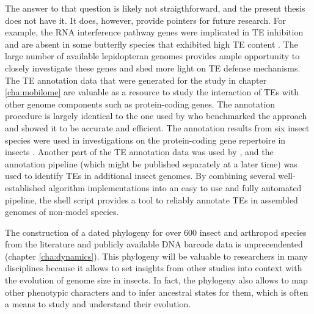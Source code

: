 The answer to that question is likely not straigthforward, and the
present thesis does not have it. It does, however, provide pointers for
future research. For example, the RNA interference pathway genes were
implicated in TE inhibition \citep{Aravin2001,Czech2008} and are absent
in some butterfly species that exhibited high TE content
\citep{Dowling2017}.  The large number of available lepidopteran genomes
provides ample opportunity to closely investigate these genes and shed
more light on TE defense mechanisms.  The TE annotation data that were
generated for the study in chapter \ref{cha:mobilome} are valuable as a
resource to study the interaction of TEs with other genome components
such as protein-coding genes. The annotation procedure is largely
identical to the one used by \citet{Reinar2016} who benchmarked the
approach and showed it to be accurate and efficient. The annotation
results from six insect species  were
used in investigations on the protein-coding gene repertoire in insects
. Another part of the TE annotation data was
used by \citep{Provataris2018}, and the annotation pipeline (which might
be published separately at a later time) was used to identify TEs in
additional insect genomes. By combining several well-established
algorithm implementations into an easy to use and fully automated
pipeline, the shell script provides a tool to reliably annotate TEs in
assembled genomes of non-model species. 

The construction of a dated phylogeny for over 600 insect and arthropod
species from the literature and publicly available DNA barcode data is
unprecendented (chapter \ref{cha:dynamics}). This phylogeny will be
valuable to researchers in many disciplines because it allows to set
insights from other studies into context with the evolution of genome
size in insects.  In fact, the phylogeny also allows to map other
phenotypic characters and to infer ancestral states for them, which is
often a means to study and understand their evolution.

